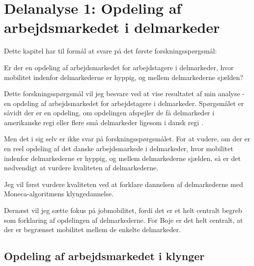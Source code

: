


\chapter{Delanalyse 1: Opdeling af arbejdsmarkedet i delmarkeder \label{kapitel_delanalyse1_deskriptivt}}

Dette kapitel har til formål at svare på det første forskningsspørgsmål:

\begin{tcolorbox}[title=Forskningspørgsmål,
subtitle style={boxrule=0.4pt} ]
	 Er der en opdeling af arbejdsmarkedet for arbejdstagere i delmarkeder, hvor mobilitet indenfor delmarkederne er hyppig, og mellem delmarkederne sjælden?
\end{tcolorbox}

Dette forskningsspørgsmål vil jeg besvare ved at vise resultatet af min analyse - en opdeling af arbejdsmarkedet for arbejdstagere i delmarkeder. Spørgsmålet er såvidt der er en opdeling, om opdelingen afspejler de få delmarkeder i amerikanske regi \parencite{Piore1980, Gordon1982} eller flere små delmarkeder ligesom i dansk regi \parencite{Boje1985, Touboel2013}.

Men det i sig selv er ikke svar på forskningsspørgsmålet. For at vudere, om der er en reel opdeling af det danske arbejdsmarkede i delmarkeder, hvor mobilitet indenfor delmarkederne er hyppig, og mellem delmarkederne sjælden, så er det nødvendigt at vurdere kvaliteten af delmarkederne.

Jeg vil først vurdere kvaliteten ved at forklare dannelsen af delmarkederne med Moneca-algoritmens klyngedannelse.

Dernæst vil jeg sætte fokus på jobmobilitet, fordi det er et helt centralt begreb som forklaring af opdelingen af delmarkederne. For Boje er det helt centralt, at der er begrænset mobilitet mellem de enkelte delmarkeder. 


\section{Opdeling af arbejdsmarkedet i klynger \label{delanalyse1_endelige mobilitetskort}}

